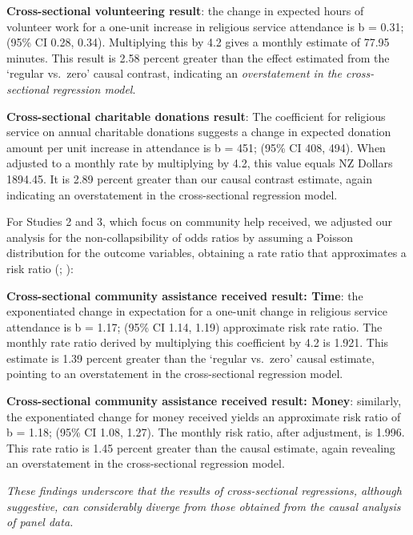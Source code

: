 \documentclass[
  single column]{article}
\begin{document}
\textbf{Cross-sectional volunteering result}: the change in expected
hours of volunteer work for a one-unit increase in religious service
attendance is b = 0.31; (95\% CI 0.28, 0.34). Multiplying this by 4.2
gives a monthly estimate of 77.95 minutes. This result is 2.58 percent
greater than the effect estimated from the `regular vs.~zero' causal
contrast, indicating an \emph{overstatement in the cross-sectional
regression model}.

\textbf{Cross-sectional charitable donations result}: The coefficient
for religious service on annual charitable donations suggests a change
in expected donation amount per unit increase in attendance is b = 451;
(95\% CI 408, 494). When adjusted to a monthly rate by multiplying by
4.2, this value equals NZ Dollars 1894.45. It is 2.89 percent greater
than our causal contrast estimate, again indicating an overstatement in
the cross-sectional regression model.

For Studies 2 and 3, which focus on community help received, we adjusted
our analysis for the non-collapsibility of odds ratios by assuming a
Poisson distribution for the outcome variables, obtaining a rate ratio
that approximates a risk ratio
(; ):

\textbf{Cross-sectional community assistance received result: Time}: the
exponentiated change in expectation for a one-unit change in religious
service attendance is b = 1.17; (95\% CI 1.14, 1.19) approximate risk
rate ratio. The monthly rate ratio derived by multiplying this
coefficient by 4.2 is 1.921. This estimate is 1.39 percent greater than
the `regular vs.~zero' causal estimate, pointing to an overstatement in
the cross-sectional regression model.

\textbf{Cross-sectional community assistance received result: Money}:
similarly, the exponentiated change for money received yields an
approximate risk ratio of b = 1.18; (95\% CI 1.08, 1.27). The monthly
risk ratio, after adjustment, is 1.996. This rate ratio is 1.45 percent
greater than the causal estimate, again revealing an overstatement in
the cross-sectional regression model.

\emph{These findings underscore that the results of cross-sectional
regressions, although suggestive, can considerably diverge from those
obtained from the causal analysis of panel data.}

\newpage{}
\end{document}
